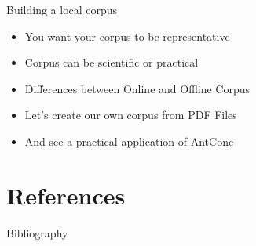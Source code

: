 \documentclass{beamer}
\begin{document}
\begin{frame}{Building a local corpus}
\begin{itemize}
\item You want your corpus to be representative
\item Corpus can be scientific or practical
\item Differences between Online and Offline Corpus

\begin{table}
\centering
\caption{Pros and Cons of Using a Local Corpus}
\label{pros_cons}
\end{table}



\end{itemize}


\end{frame}

\begin{frame}
\begin{itemize}
\item Let's create our own corpus from PDF Files
\item And see a practical application of AntConc
\end{itemize}
\end{frame}
	
\section{References}

\begin{frame}[allowframebreaks]{Bibliography}




\end{frame}
\end{document}
